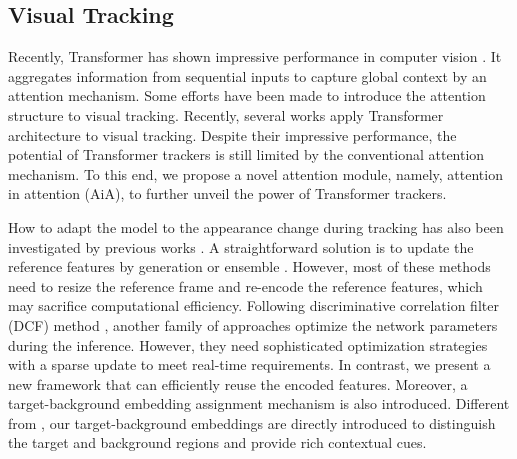 \subsection{Visual Tracking}
Recently, Transformer \cite{vaswani2017attention} has shown impressive performance in computer vision \cite{carion2020end,zhu2020deformable,dosovitskiy2020image}. It aggregates information from sequential inputs to capture global context by an attention mechanism. Some efforts \cite{yu2020deformable,guo2021graph,fu2021stmtrack} have been made to introduce the attention structure to visual tracking. Recently, several works \cite{wang2021transformer,chen2021transformer,yu2021high,cao2021hift,yan2021learning,xing2022siamese} apply Transformer architecture to visual tracking. Despite their impressive performance, the potential of Transformer trackers is still limited by the conventional attention mechanism. To this end, we propose a novel attention module, namely, attention in attention (AiA), to further unveil the power of Transformer trackers.

How to adapt the model to the appearance change during tracking has also been investigated by previous works \cite{danelljan2019atom,bhat2019learning,zhang2019learning,dai2020high,bhat2020know,fu2021stmtrack,wang2021transformer,yan2021learning}. A straightforward solution is to update the reference features by generation \cite{zhang2019learning} or ensemble \cite{fu2021stmtrack,wang2021transformer,yan2021learning}. However, most of these methods need to resize the reference frame and re-encode the reference features, which may sacrifice computational efficiency. Following discriminative correlation filter (DCF) method \cite{henriques2014high}, another family of approaches \cite{danelljan2019atom,bhat2019learning} optimize the network parameters during the inference. However, they need sophisticated optimization strategies with a sparse update to meet real-time requirements. In contrast, we present a new framework that can efficiently reuse the encoded features. Moreover, a target-background embedding assignment mechanism is also introduced. Different from \cite{ge2021video,yang2021associating,lan2021siamese}, our target-background embeddings are directly introduced to distinguish the target and background regions and provide rich contextual cues.

